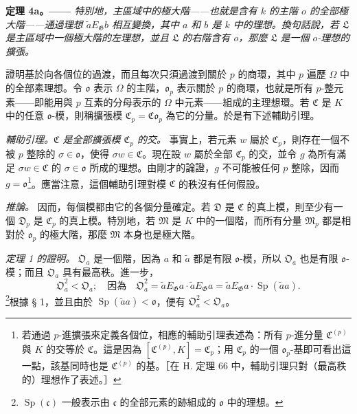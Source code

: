 \documentclass[11pt]{article}
\providecommand{\Gg}{\mathfrak G}
\providecommand{\oo}{\mathfrak o}
\providecommand{\Sp}{\operatorname{Sp}}
\begin{document}
\medskip
\noindent\textbf{定理 4a。——} \emph{特別地，主區域中的極大階——也就是含有 \(k\) 的主階 \(o\) 的全部極大階——通過理想 \(\widetilde aE_\Gg b\) 相互變換，其中 \(a\) 和 \(b\) 是 \(k\) 中的理想。換句話說，若 \(\mathfrak L\) 是主區域中一個極大階的左理想，並且 \(\mathfrak L\) 的右階含有 \(o\)，那麼 \(\mathfrak L\) 是一個 \(o\)-理想的擴張。}

證明基於向各個位的過渡，而且每次只須過渡到關於 \(p\) 的商環，其中 \(p\) 遍歷 \(\Omega\) 中的全部素理想。令 \(\oo\) 表示 \(\Omega\) 的主階，\(\oo_p\) 表示關於 \(p\) 的商環，也就是所有 \(p\)-整元素——即能用與 \(p\) 互素的分母表示的 \(\Omega\) 中元素——組成的主理想環。若 \(\mathfrak C\) 是 \(K\) 中的任意 \(\oo\)-模，則稱擴張模 \(\mathfrak C_p=\mathfrak C\oo_p\) 為它的分量。於是有下述輔助引理。

\medskip
\noindent\emph{輔助引理。\(\mathfrak C\) 是全部擴張模 \(\mathfrak C_p\) 的交。} 事實上，若元素 \(w\) 屬於 \(\mathfrak C_p\)，則存在一個不被 \(p\) 整除的 \(\sigma\in\oo\)，使得 \(\sigma w\in\mathfrak C\)。現在設 \(w\) 屬於全部 \(\mathfrak C_p\) 的交，並令 \(g\) 為所有滿足 \(\sigma w\in\mathfrak C\) 的 \(\sigma\in\oo\) 所成的理想。由剛才的論證，\(g\) 不可能被任何 \(p\) 整除，因而 \(g=\oo\)\footnote{若通過 \(p\)-進擴張來定義各個位，相應的輔助引理表述為：所有 \(p\)-進分量 \(\mathfrak C^{(p)}\) 與 \(K\) 的交等於 \(\mathfrak C\)。這是因為 \([\mathfrak C^{(p)},K]=\mathfrak C_p\)；用 \(\mathfrak C_p\) 的一個 \(\oo_p\)-基即可看出這一點，該基同時也是 \(\mathfrak C^{(p)}\) 的基。［在 H. 定理 66 中，輔助引理只對（最高秩的）理想作了表述。］}。應當注意，這個輔助引理對模 \(\mathfrak C\) 的秩沒有任何假設。

\emph{推論。} 因而，每個模都由它的各個分量確定。若 \(\mathfrak D\) 是 \(\mathfrak C\) 的真上模，則至少有一個 \(\mathfrak D_p\) 是 \(\mathfrak C_p\) 的真上模。特別地，若 \(\mathfrak M\) 是 \(K\) 中的一個階，而所有分量 \(\mathfrak M_p\) 都是相對於 \(\oo_p\) 的極大階，那麼 \(\mathfrak M\) 本身也是極大階。

\medskip
\noindent\emph{定理 1 的證明。} \(\mathfrak O_a\) 是一個階，因為 \(a\) 和 \(\widetilde a\) 都是有限 \(\oo\)-模，所以 \(\mathfrak O_a\) 也是有限 \(\oo\)-模；而且 \(\mathfrak O_a\) 具有最高秩。進一步，
\[
\mathfrak O_a^2<\mathfrak O_a;
\quad\text{因為}\quad
\mathfrak O_a^2
 =\widetilde aE_\Gg a\cdot\widetilde aE_\Gg a
 =\widetilde aE_\Gg a\cdot\Sp(\widetilde a a).
\]
\footnote{\(\Sp(\mathfrak c)\) 一般表示由 \(\mathfrak c\) 的全部元素的跡組成的 \(\oo\) 中的理想。}根據 § 1，並且由於 \(\Sp(\widetilde a a)<\oo\)，便有 \(\mathfrak O_a^2<\mathfrak O_a\)。
\end{document}
